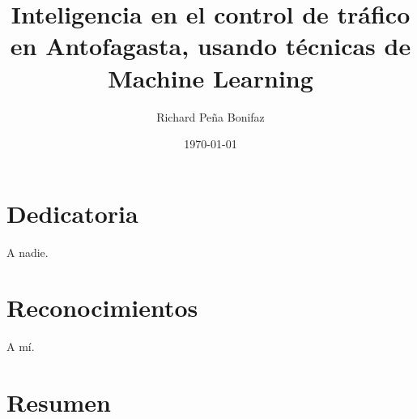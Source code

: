 \documentclass[12pt]{article}
\begin{document}
\title{Inteligencia en el control de tráfico en Antofagasta, usando técnicas de Machine Learning}
\author{Richard Peña Bonifaz}
\date{\today}
\maketitle

\section*{Dedicatoria}
A nadie.
\section*{Reconocimientos}
A mí.

\section*{Resumen}
\end{document}

